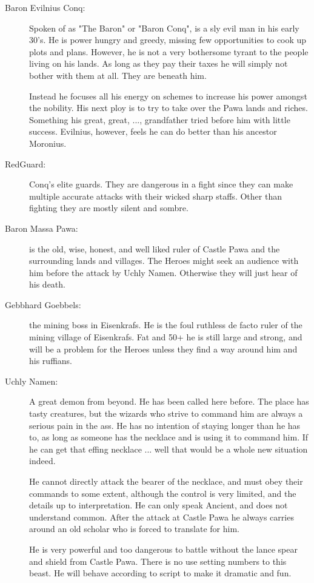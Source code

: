 \documentclass[11pt, twoside, titlepage, a4paper]{report}
\begin{document}
\begin{description}
\item[Baron Evilnius Conq:] Spoken of as "The Baron" or "Baron Conq", is a sly evil man in his early 30's. He is power hungry and greedy, missing few opportunities to cook up plots and plans. However, he is not a very bothersome tyrant to the people living on his lands. As long as they pay their taxes he will simply not bother with them at all. They are beneath him.

Instead he focuses all his energy on schemes to increase his power amongst the nobility. His next ploy is to try to take over the Pawa lands and riches. Something his great, great, ..., grandfather tried before him with little success. Evilnius, however, feels he can do better than his ancestor Moronius.


\item[RedGuard:] Conq's elite guards. They are dangerous in a fight since they can make multiple accurate attacks with their wicked sharp staffs. Other than fighting they are mostly silent and sombre.


\item[Baron Massa Pawa:] is the old, wise, honest, and well liked ruler of Castle Pawa and the surrounding lands and villages. The Heroes might seek an audience with him before the attack by Uchly Namen. Otherwise they will just hear of his death.


\item[Gebbhard Goebbels:] the mining boss in Eisenkrafs. He is the foul ruthless de facto ruler of the mining village of Eisenkrafs. Fat and 50+ he is still large and strong, and will be a problem for the Heroes unless they find a way around him and his ruffians.


\item[Uchly Namen:] A great demon from beyond. He has been called here before. The place has tasty creatures, but the wizards who strive to command him are always a serious pain in the ass. He has no intention of staying longer than he has to, as long as someone has the necklace and is using it to command him. If he can get that effing necklace ... well that would be a whole new situation indeed.

He cannot directly attack the bearer of the necklace, and must obey their commands to some extent, although the control is very limited, and the details up to interpretation. He can only speak Ancient, and does not understand common. After the attack at Castle Pawa he always carries around an old scholar who is forced to translate for him.

He is very powerful and too dangerous to battle without the lance spear and shield from Castle Pawa. There is no use setting numbers to this beast. He will behave according to script to make it dramatic and fun.

\end{description}
\end{document}
